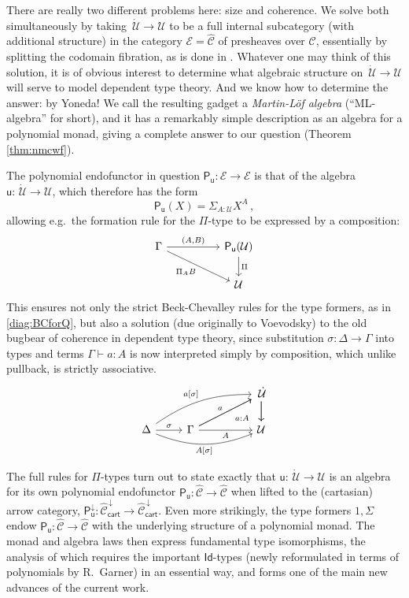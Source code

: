 \documentclass[12pt,reqno]{amsart}
\newcommand{\CC}{\ensuremath{\mathcal{C}}}
\newcommand{\EE}{\ensuremath{\mathcal{E}}}
\newcommand{\alg}[1]{\ensuremath{\mathsf{#1}}}
\renewcommand{\to}{\ensuremath{\rightarrow}}
\newcommand{\too}{\ensuremath{\longrightarrow}}
\newcommand{\Id}{\mathsf{Id}}
\newcommand{\U}{\ensuremath{\mathcal{U}}}
\newcommand{\UU}{\ensuremath{\,\dot{\mathcal{U}}}}
\renewcommand{\u}{\ensuremath{\mathsf{u}}}
\renewcommand{\t}{\ensuremath{\mathsf{u}}}
\theoremstyle{remark}
\theoremstyle{definition}
\begin{document}
There are really two different problems here: size and coherence.  We solve both simultaneously by taking $\UU \to \U$ to be a full internal subcategory (with additional structure) in the category $\EE = \widehat{\CC}$ of presheaves over $\CC$, essentially by splitting the codomain fibration, as is done in \cite{Lums-Warren}.  Whatever one may think of this solution, it is of obvious interest to determine what algebraic structure on $\UU \to \U$ will serve to model dependent type theory. And we know how to determine the answer: by Yoneda!  We call the resulting gadget a \emph{Martin-L\"of algebra} (``ML-algebra'' for short), and it has a remarkably simple description as an algebra for a polynomial monad, giving a complete answer to our question (Theorem \ref{thm:nmcwf}).

The polynomial endofunctor in question $\alg{P}_\t : \EE \to \EE$  is that of the algebra $\u:\UU \to \U$, which therefore has the form
\[
\alg{P}_{\u}(X) = \Sigma_{A: \U} X^A\,,
\]
allowing e.g.\ the formation rule for the $\Pi$-type to be expressed by a composition:
\begin{equation*}
\begin{tikzcd}
 \Gamma \ar[rr, "{(A,B)}" ] \ar[rrd,swap,  "{\Pi_A B}"] &&\alg{P}_\u (\U) \ar[d, "{\Pi}"] \\
 && \U
\end{tikzcd}
\end{equation*} 
This ensures not only the strict Beck-Chevalley rules for the type formers, as in \eqref{diag:BCforQ}, but also a solution (due originally to Voevodsky) to the old bugbear of coherence in dependent type theory, since substitution $\sigma : \Delta \to \Gamma$ into types and terms $\Gamma \vdash a:A$ is now interpreted simply by composition, which unlike pullback, is strictly associative.
\[
\begin{tikzcd}
 	&&&  {\UU} \ar[d]\ar[d]\\
\Delta \ar[r,  "{\sigma}"] \ar[rrru, bend left = 4ex, "{a[\sigma]}"]\ar[rrr, swap, bend right = 5ex, "{A[\sigma]}"] & \Gamma \ar[rru, "a"]   \ar[rru, swap, "{\ \ a:A}"]  \ar[rr ,swap,  "A"]  && {\U}
\end{tikzcd}
\]

The full rules for $\Pi$-types turn out to state exactly that $\u : \UU\to\U$ is an algebra for its own polynomial endofunctor $\alg{P}_{\u} : \widehat{\CC} \to \widehat{\CC}$ when lifted to the (cartasian) arrow category, $\alg{P}_{\u}^{\downarrow}: \widehat{\CC}^{\,\downarrow}_{\mathsf{cart}} \too \widehat{\CC}^{\,\downarrow}_{\mathsf{cart}}$.
Even more strikingly, the type formers $1, \Sigma$ endow $\alg{P}_{\u} : \widehat{\CC} \to \widehat{\CC}$ with the underlying structure of a polynomial monad.  The monad and algebra laws then express fundamental type isomorphisms, the analysis of which requires the important $\Id{}$-types (newly reformulated in terms of polynomials by R.\ Garner) in an essential way, and forms one of the main new advances of the current work.
\end{document}
